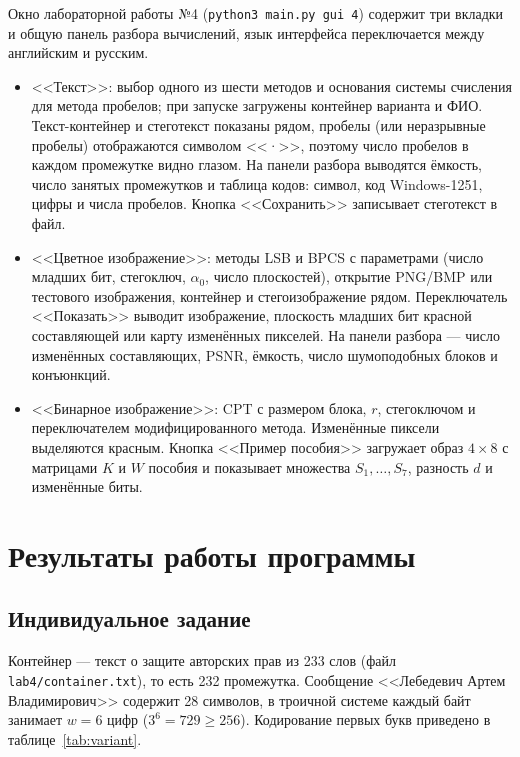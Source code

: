 \documentclass[14pt,a4paper]{extarticle}
\begin{document}
Окно лабораторной работы №4 (\texttt{python3 main.py gui 4}) содержит три вкладки и
общую панель разбора вычислений, язык интерфейса переключается между английским и
русским.
\begin{itemize}
\item <<Текст>>: выбор одного из шести методов и основания системы счисления для
метода пробелов; при запуске загружены контейнер варианта и ФИО. Текст-контейнер и
стеготекст показаны рядом, пробелы (или неразрывные пробелы) отображаются символом
<<·>>, поэтому число пробелов в каждом промежутке видно глазом. На панели разбора
выводятся ёмкость, число занятых промежутков и таблица кодов: символ, код
Windows-1251, цифры и числа пробелов. Кнопка <<Сохранить>> записывает стеготекст в
файл.
\item <<Цветное изображение>>: методы LSB и BPCS с параметрами (число младших бит,
стегоключ, $\alpha_0$, число плоскостей), открытие PNG/BMP или тестового
изображения, контейнер и стегоизображение рядом. Переключатель <<Показать>> выводит
изображение, плоскость младших бит красной составляющей или карту изменённых
пикселей. На панели разбора --- число изменённых составляющих, PSNR, ёмкость, число
шумоподобных блоков и конъюнкций.
\item <<Бинарное изображение>>: CPT с размером блока, $r$, стегоключом и
переключателем модифицированного метода. Изменённые пиксели выделяются красным.
Кнопка <<Пример пособия>> загружает образ $4 \times 8$ с матрицами $K$ и $W$ пособия и
показывает множества $S_1, \ldots, S_7$, разность $d$ и изменённые биты.
\end{itemize}

\section{Результаты работы программы}

\subsection{Индивидуальное задание}

Контейнер --- текст о защите авторских прав из 233 слов (файл
\texttt{lab4/container.txt}), то есть 232 промежутка. Сообщение <<Лебедевич Артем
Владимирович>> содержит 28 символов, в троичной системе каждый байт занимает
$w = 6$ цифр ($3^6 = 729 \ge 256$). Кодирование первых букв приведено в
таблице~\ref{tab:variant}.
\end{document}
